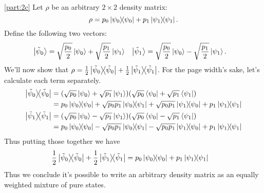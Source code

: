 \documentclass[boxes,pages]{homework}
\begin{document}
\begin{solution}
	\ref{part:2c}
	Let $\rho$ be an arbitrary $2\times 2$ density matrix:
	\begin{equation*}
		\rho = p_0\ketbra{\psi_0}{\psi_0} + p_1\ketbra{\psi_1}{\psi_1}.
	\end{equation*}
	Define the following two vectors:
	\begin{align*}
		\ket{\tilde{\psi}_0} & = \sqrt{\frac{p_0}{2}}\ket{\psi_0} + \sqrt{\frac{p_1}{2}}\ket{\psi_1} & \ket{\tilde{\psi}_1} & = \sqrt{\frac{p_0}{2}}\ket{\psi_0} - \sqrt{\frac{p_1}{2}}\ket{\psi_1}.
	\end{align*}
	We'll now show that $\rho = \frac{1}{2}\ketbra{\tilde{\psi}_0}{\tilde{\psi}_0} + \frac{1}{2}\ketbra{\tilde{\psi}_1}{\tilde{\psi}_1}$. For the page width's sake, let's calculate each term separately.
	\begin{align*}
		\ketbra{\tilde{\psi}_0}{\tilde{\psi}_0} & = \qty(\sqrt{p_0}\ket{\psi_0} + \sqrt{p_1}\ket{\psi_1})\qty(\sqrt{p_0}\bra{\psi_0} + \sqrt{p_1}\bra{\psi_1})                            \\
		                                        & = p_0\ketbra{\psi_0}{\psi_0} + \sqrt{p_0p_1}\ketbra{\psi_0}{\psi_1} + \sqrt{p_0p_1}\ketbra{\psi_1}{\psi_0} + p_1\ketbra{\psi_1}{\psi_1} \\
		\ketbra{\tilde{\psi}_1}{\tilde{\psi}_1} & = \qty(\sqrt{p_0}\ket{\psi_0} - \sqrt{p_1}\ket{\psi_1})\qty(\sqrt{p_0}\bra{\psi_0} -\sqrt{p_1}\bra{\psi_1})                             \\
		                                        & = p_0\ketbra{\psi_0}{\psi_0} - \sqrt{p_0p_1}\ketbra{\psi_0}{\psi_1} - \sqrt{p_0p_1}\ketbra{\psi_1}{\psi_0} + p_1\ketbra{\psi_1}{\psi_1} \\
	\end{align*}
	Thus putting those together we have
	\begin{align*}
		\frac{1}{2}\ketbra{\tilde{\psi}_0}{\tilde{\psi}_0} + \frac{1}{2}\ketbra{\tilde{\psi}_1}{\tilde{\psi}_1} & = p_0\ketbra{\psi_0}{\psi_0} + p_1\ketbra{\psi_1}{\psi_1}
	\end{align*}
	Thus we conclude it's possible to write an arbitrary density matrix as an equally weighted mixture of pure states.
\end{solution}

\end{document}
